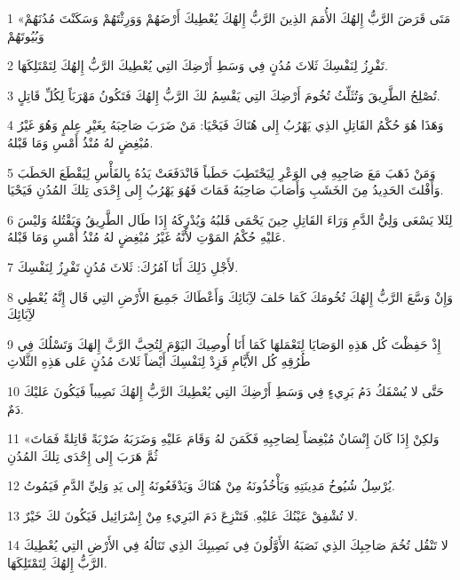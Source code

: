 \par 1 «مَتَى قَرَضَ الرَّبُّ إِلهُكَ الأُمَمَ الذِينَ الرَّبُّ إِلهُكَ يُعْطِيكَ أَرْضَهُمْ وَوَرِثْتَهُمْ وَسَكَنْتَ مُدُنَهُمْ وَبُيُوتَهُمْ
\par 2 تَفْرِزُ لِنَفْسِكَ ثَلاثَ مُدُنٍ فِي وَسَطِ أَرْضِكَ التِي يُعْطِيكَ الرَّبُّ إِلهُكَ لِتَمْتَلِكَهَا.
\par 3 تُصْلِحُ الطَّرِيقَ وَتُثَلِّثُ تُخُومَ أَرْضِكَ التِي يَقْسِمُ لكَ الرَّبُّ إِلهُكَ فَتَكُونُ مَهْرَبَاً لِكُلِّ قَاتِلٍ.
\par 4 وَهَذَا هُوَ حُكْمُ القَاتِلِ الذِي يَهْرُبُ إِلى هُنَاكَ فَيَحْيَا: مَنْ ضَرَبَ صَاحِبَهُ بِغَيْرِ عِلمٍ وَهُوَ غَيْرُ مُبْغِضٍ لهُ مُنْذُ أَمْسِ وَمَا قَبْلهُ.
\par 5 وَمَنْ ذَهَبَ مَعَ صَاحِبِهِ فِي الوَعْرِ لِيَحْتَطِبَ حَطَباً فَانْدَفَعَتْ يَدُهُ بِالفَأْسِ لِيَقْطَعَ الحَطَبَ وَأَفْلتَ الحَدِيدُ مِنَ الخَشَبِ وَأَصَابَ صَاحِبَهُ فَمَاتَ فَهُوَ يَهْرُبُ إِلى إِحْدَى تِلكَ المُدُنِ فَيَحْيَا.
\par 6 لِئَلا يَسْعَى وَلِيُّ الدَّمِ وَرَاءَ القَاتِلِ حِينَ يَحْمَى قَلبُهُ وَيُدْرِكَهُ إِذَا طَال الطَّرِيقُ وَيَقْتُلهُ وَليْسَ عَليْهِ حُكْمُ المَوْتِ لأَنَّهُ غَيْرُ مُبْغِضٍ لهُ مُنْذُ أَمْسِ وَمَا قَبْلهُ.
\par 7 لأَجْلِ ذَلِكَ أَنَا آمُرُكَ: ثَلاثَ مُدُنٍ تَفْرِزُ لِنَفْسِكَ.
\par 8 وَإِنْ وَسَّعَ الرَّبُّ إِلهُكَ تُخُومَكَ كَمَا حَلفَ لآِبَائِكَ وَأَعْطَاكَ جَمِيعَ الأَرْضِ التِي قَال إِنَّهُ يُعْطِي لآِبَائِكَ
\par 9 إِذْ حَفِظْتَ كُل هَذِهِ الوَصَايَا لِتَعْمَلهَا كَمَا أَنَا أُوصِيكَ اليَوْمَ لِتُحِبَّ الرَّبَّ إِلهَكَ وَتَسْلُكَ فِي طُرُقِهِ كُل الأَيَّامِ فَزِدْ لِنَفْسِكَ أَيْضاً ثَلاثَ مُدُنٍ عَلى هَذِهِ الثَّلاثِ
\par 10 حَتَّى لا يُسْفَكُ دَمُ بَرِيءٍ فِي وَسَطِ أَرْضِكَ التِي يُعْطِيكَ الرَّبُّ إِلهُكَ نَصِيباً فَيَكُونَ عَليْكَ دَمٌ.
\par 11 «وَلكِنْ إِذَا كَانَ إِنْسَانٌ مُبْغِضاً لِصَاحِبِهِ فَكَمَنَ لهُ وَقَامَ عَليْهِ وَضَرَبَهُ ضَرْبَةً قَاتِلةً فَمَاتَ ثُمَّ هَرَبَ إِلى إِحْدَى تِلكَ المُدُنِ
\par 12 يُرْسِلُ شُيُوخُ مَدِينَتِهِ وَيَأْخُذُونَهُ مِنْ هُنَاكَ وَيَدْفَعُونَهُ إِلى يَدِ وَلِيِّ الدَّمِ فَيَمُوتُ.
\par 13 لا تُشْفِقْ عَيْنُكَ عَليْهِ. فَتَنْزِعَ دَمَ البَرِيءِ مِنْ إِسْرَائِيل فَيَكُونَ لكَ خَيْرٌ.
\par 14 لا تَنْقُل تُخُمَ صَاحِبِكَ الذِي نَصَبَهُ الأَوَّلُونَ فِي نَصِيبِكَ الذِي تَنَالُهُ فِي الأَرْضِ التِي يُعْطِيكَ الرَّبُّ إِلهُكَ لِتَمْتَلِكَهَا.
